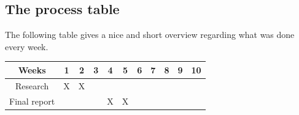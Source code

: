       \subsection{The process table} \label{ssec:processtable}
      The following table gives a nice and short overview regarding what was done
      every week.\\
      \begin{tabular}{| c | c | c | c | c | c | c | c | c | c | c |}
	      \hline
	      Weeks & 1 & 2 & 3 & 4 & 5 & 6 & 7 & 8 & 9 & 10 \\
	      \hline
	      Research & X & X & \space & \space & \space & \space & \space & \space & \space & \space \\
	      \hline
	      Final report & \space & \space & \space & X & X & \space & \space & \space & \space & \space \\
	      \hline
      \end{tabular}
